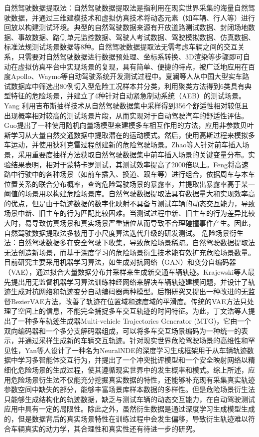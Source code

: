 自然驾驶数据提取法：自然驾驶数据提取法是指利用在现实世界采集的海量自然驾驶数据，并通过三维建模技术和虚拟仿真技术将动态元素（如车辆、行人等）进行回放以构建测试环境。典型的自然驾驶数据来源有开放道路测试数据、封闭场地数据、事故数据、路侧单元监控数据、驾驶人考试数据、驾驶模拟数据、仿真数据、标准法规测试场景数据等8种。自然驾驶数据提取法无需考虑车辆之间的交互关系，只需要对自然驾驶数据进行数据预处理、坐标系转换、3D渲染等步骤即可自动在虚拟仿真平台中实现场景的复现，具有简单、便捷的特点，被广泛地应用在百度Apollo、Waymo等自动驾驶系统开发测试过程中。夏澜等人从中国大型实车路试数据库中筛选出80例切入型危险工况样本并分类，利用聚类方法得到6类具有典型特征的危险场景，并建立了4种针对自动紧急制动系统（AEB）的测试场景。Yang 利用吉布斯抽样技术从自然驾驶数据集中采样得到356个舒适性相对较低且出现概率相对较高的测试场景片段，从而实现对于自动驾驶汽车的舒适性评估。Guo提出了一种使用随机向量场模型来建模多车相互作用的方法，应用非参数贝叶斯学习从大量自然交通数据中提取潜在的运动模式。然后，使用高斯过程来模拟多车运动，并使用狄利克雷过程创建新的危险驾驶场景。Zhao等人针对前车插入场景，采用重要度抽样方法获取自然驾驶数据集中前车插入场景的关键变量分布。实验结果表明，相对于蒙特卡罗测试，其测试效率提高了2000倍以上。Feng将高速路中行驶中的各种场景（如前车插入、换道、跟车等）进行组合，依据周车与本车位置关系的联合分布概率，查询危险驾驶场景的暴露率，并提取出暴露率高于某一阈值的场景用以构建危险场景库。自然驾驶数据提取法具有数据量大和实现效率高的优点，但是由于轨迹数据的数字化映射不具备与测试车辆的动态交互能力，导致场景中新、旧主车的行为匹配比较困难。当测试过程中新、旧主车的行为差异比较大时，易导致仿真场景和真实场景严重错位从而导致不合理碰撞事件产生。因此，自然驾驶数据提取法多被用于小尺度算法迭代升级的研发测试。
危险场景衍生法：自然驾驶数据多在安全驾驶下收集，导致危险场景稀疏。自然驾驶数据提取法无法创造新场景，而基于深度学习的危险场景衍生技术能有效扩充危险场景数量。目前研究主要采用机器学习算法，如生成对抗网络（GAN）和变分自编码器（VAE），通过拟合大量数据分布并采样来生成新交通车辆轨迹。Krajewski等人最先提出用无监督机器学习算法训练神经网络来解决车辆轨迹建模问题，并设计了轨迹生成对抗网络和轨迹变分自动编码器两种模型。后期研究又提出一种改进的无监督BezierVAE方法，改善了轨迹在位置域和速度域的平滑度。传统的VAE方法只处理了空间上的信息，不能完全捕捉多车交互轨迹的时间特征。为此，丁文浩等人提出了一种多车轨迹生成器Multi-vehicle Trajectories Generator (MTG)，它由一个双向编码器和一个多分支解码器组成，可以将多车交互场景编码为一种统一的表示，并通过采样生成新的车辆交互轨迹。针对现实世界危险驾驶场景的高维性和罕见性，Yan等人设计了一种名为NeuralNDE的深度学习生成框架用于从车辆轨迹数据中学习多智能体交互行为，并提出了一个冲突批评模型和一个安全映射网络以精细化危险场景的生成过程，使其遵循现实世界中的发生概率和模式。综上所述，应用危险场景衍生法不仅能充分挖掘真实数据的特性，还能够补充现有采集真实轨迹参数空间中缺失的部分，能够丰富场景库样本数据的多样性。但是危险场景衍生法只能够生成结构化的轨迹数据，缺乏与测试车辆的动态交互能力，在自动驾驶测试应用中具有一定的局限性。除此之外，虽然衍生数据是通过深度学习生成模型生成的，但是数据背后的真实场景特性在训练过程中会发生偏移，导致衍生轨迹难以符合车辆真实的动力学，其合理性和真实性还有待进一步的研究。
